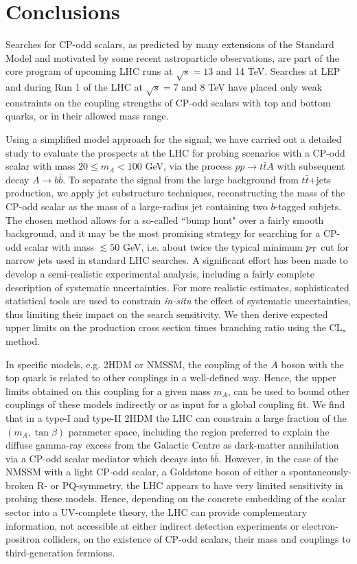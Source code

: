 \documentclass[preprintnumbers,superscriptaddress,nofootinbib,aps,prd,floatfix]{revtex4}
\newcommand{\pt}{p_{\rm{T}}}
\begin{document}
\section{Conclusions}
\label{sec:conclusion}

Searches for CP-odd scalars, as predicted by many extensions of the Standard Model and motivated by some recent astroparticle observations, are part of the core program of upcoming LHC runs at $\sqrt{s}=13$ and 14 TeV. Searches at LEP and during Run 1 of the LHC at $\sqrt{s}=7$ and 8 TeV have placed only weak constraints on the coupling strengths of CP-odd scalars with top and bottom quarks, or in their allowed mass range.

Using a simplified model approach for the signal, we have carried out a detailed study to evaluate the prospects at the LHC for probing scenarios with a 
CP-odd scalar with mass $20 \leq m_A < 100$ GeV, via the process $pp \to t\bar{t}A$ with subsequent decay $A\to b\bar{b}$. To separate the signal from the large background from $t\bar{t}$+jets production, we apply jet substructure techniques, reconstructing the mass of the CP-odd scalar as the mass of a 
large-radius jet containing two $b$-tagged subjets. 
The chosen method allows for a so-called ``bump hunt" over a fairly smooth background, and it may be the most promising strategy for searching for a CP-odd scalar with mass $\lesssim 50$ GeV, i.e. about twice the typical minimum $\pt$ cut for narrow jets used in standard LHC searches. A significant effort has been made to develop a semi-realistic experimental analysis, including a fairly complete description of systematic uncertainties. For more realistic estimates, 
sophisticated statistical tools are used to constrain  {\em in-situ} the effect of systematic uncertainties, thus limiting their impact on the search sensitivity. We then derive expected upper limits on the production cross section times branching ratio using the CL$_{\rm{s}}$ method.

In specific models, e.g. 2HDM or NMSSM, the coupling of the $A$ boson with the top quark is related to other couplings in a well-defined way. Hence, the upper 
limits obtained on this coupling for a given mass $m_A$, can be used to bound other couplings of these models indirectly or as input for 
a global coupling fit. We find that in a type-I and type-II 2HDM the LHC can constrain a large fraction of the $(m_A, \tan \beta)$ parameter space, including 
the region preferred to explain the diffuse gamma-ray excess from the Galactic Centre as dark-matter annihilation via a CP-odd scalar mediator which decays
into $b\bar{b}$. 
However, in the case of the NMSSM with a light CP-odd scalar, a Goldstone boson of either a spontaneously-broken R- or PQ-symmetry, 
the LHC appears to have very limited sensitivity in probing these models. 
Hence, depending on the concrete embedding of the scalar sector into a UV-complete theory, the LHC can provide complementary information, not accessible at either indirect detection experiments or electron-positron colliders, on the existence of CP-odd scalars, their mass and couplings to third-generation fermions.
\end{document}
